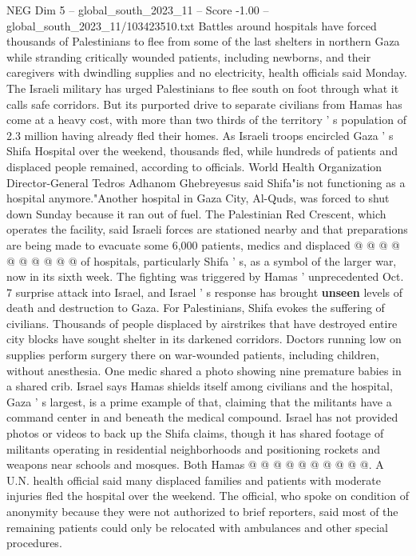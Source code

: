 \begin{textsample}{NEG Dim 5 – global\_south\_2023\_11 – Score -1.00 – global\_south\_2023\_11/103423510.txt}  \label{ex:f5_neg_200}
Battles around hospitals have forced thousands of Palestinians to flee from some of the last shelters in northern Gaza while stranding critically wounded patients, including newborns, and their caregivers with dwindling supplies and no electricity, health officials said Monday.
The Israeli military has urged Palestinians to flee south on foot through what it calls safe corridors.
But its purported drive to separate civilians from Hamas has come at a heavy cost, with more than two thirds of the territory ' s population of 2.3 million having already fled their homes.
As Israeli troops encircled Gaza ' s Shifa Hospital over the weekend, thousands fled, while hundreds of patients and displaced people remained, according to officials.
World Health Organization Director-General Tedros Adhanom Ghebreyesus said Shifa"is not functioning as a hospital anymore."Another hospital in Gaza City, Al-Quds, was forced to shut down Sunday because it ran out of fuel.
The Palestinian Red Crescent, which operates the facility, said Israeli forces are stationed nearby and that preparations are being made to evacuate some 6,000 patients, medics and displaced @ @ @ @ @ @ @ @ @ @ of hospitals, particularly Shifa ' s, as a symbol of the larger war, now in its sixth week.
The fighting was triggered by Hamas ' unprecedented Oct. 7 surprise attack into Israel, and Israel ' s response has brought \textbf{unseen} levels of death and destruction to Gaza.
For Palestinians, Shifa evokes the suffering of civilians.
Thousands of people displaced by airstrikes that have destroyed entire city blocks have sought shelter in its darkened corridors.
Doctors running low on supplies perform surgery there on war-wounded patients, including children, without anesthesia.
One medic shared a photo showing nine premature babies in a shared crib.
Israel says Hamas shields itself among civilians and the hospital, Gaza ' s largest, is a prime example of that, claiming that the militants have a command center in and beneath the medical compound.
Israel has not provided photos or videos to back up the Shifa claims, though it has shared footage of militants operating in residential neighborhoods and positioning rockets and weapons near schools and mosques.
Both Hamas @ @ @ @ @ @ @ @ @ @.
A U.N. health official said many displaced families and patients with moderate injuries fled the hospital over the weekend.
The official, who spoke on condition of anonymity because they were not authorized to brief reporters, said most of the remaining patients could only be relocated with ambulances and other special procedures.

\end{textsample}
